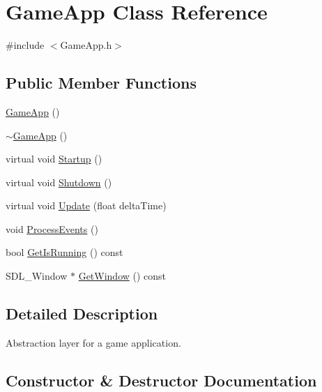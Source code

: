 \hypertarget{class_game_app}{}\section{Game\+App Class Reference}
\label{class_game_app}


{\ttfamily \#include $<$Game\+App.\+h$>$}

\subsection*{Public Member Functions}
\begin{DoxyCompactItemize}
\item 
\mbox{\hyperlink{class_game_app_a60fa14c5e72ac86d85257732494210ce}{Game\+App}} ()
\item 
\mbox{\hyperlink{class_game_app_ae23ced12f4a79184b3719b3905c58170}{$\sim$\+Game\+App}} ()
\item 
virtual void \mbox{\hyperlink{class_game_app_a9d9218c197e35c45cd0027f109dcd6a2}{Startup}} ()
\item 
virtual void \mbox{\hyperlink{class_game_app_a0dc0f7396813debb806c16d79efcb111}{Shutdown}} ()
\item 
virtual void \mbox{\hyperlink{class_game_app_af48020622e6db3aa8e55458c3abdff87}{Update}} (float delta\+Time)
\item 
void \mbox{\hyperlink{class_game_app_a62c5268bda2f50c7535848cd21c884b4}{Process\+Events}} ()
\item 
bool \mbox{\hyperlink{class_game_app_aabc1e7e91c577c681c1ef8e45b926286}{Get\+Is\+Running}} () const
\item 
S\+D\+L\+\_\+\+Window $\ast$ \mbox{\hyperlink{class_game_app_a08fc92ae5300a57c05f7bafefa53b82e}{Get\+Window}} () const
\end{DoxyCompactItemize}


\subsection{Detailed Description}
Abstraction layer for a game application. 

\subsection{Constructor \& Destructor Documentation}
\mbox{\label{class_game_app_a60fa14c5e72ac86d85257732494210ce}} 
